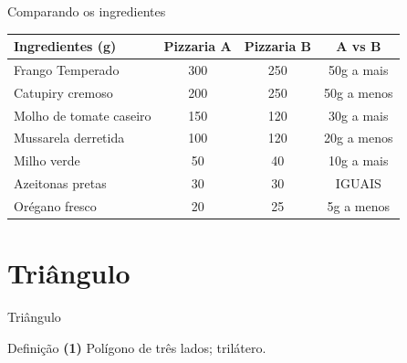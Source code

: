 \documentclass[12pt]{beamer}
\begin{document}
    \begin{frame}{Comparando os ingredientes}
    
        \begin{table}[h]
        \centering
        \small
        \renewcommand{\arraystretch}{1.3}
            \begin{tabular}{lccc}
                \hline
                \textbf{Ingredientes (g)} & \textbf{Pizzaria A} & \textbf{Pizzaria B} & \textbf{A vs B} \\
                \hline
                Frango Temperado & 300 & 250 & 50g a mais \\
                Catupiry cremoso & 200 & 250 & 50g a menos \\
                Molho de tomate caseiro & 150 & 120 & 30g a mais \\
                Mussarela derretida & 100 & 120 & 20g a menos \\
                Milho verde & 50 & 40 & 10g a mais \\
                Azeitonas pretas & 30 & 30 & IGUAIS \\
                Orégano fresco & 20 & 25 & 5g a menos \\
                \hline
            \end{tabular}
        \end{table}

    \end{frame}
    
\section{Triângulo}

    \begin{frame}{Triângulo}
        \begin{alertblock}{Definição}
        \justifying
            \textbf{(1)} Polígono de três lados; trilátero.\\
            \\
            \\
        \end{alertblock}
    \end{frame}
\end{document}
